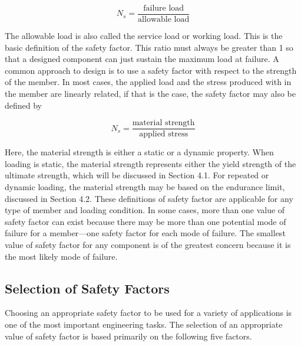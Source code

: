 \documentclass[a4paper,openany,12pt]{book}
\begin{document}
$$N_s = \frac{\text{failure load}}{\text{allowable load}}$$

The allowable load is also called the service load or working load. This
is the basic definition of the safety factor. This ratio must always be
greater than 1 so that a designed component can just sustain the maximum
load at failure. A common approach to design is to use a safety factor
with respect to the strength of the member. In most cases, the applied
load and the stress produced with in the member are linearly related, if
that is the case, the safety factor may also be defined by

$$N_s = \frac{\text{material strength}}{\text{applied stress}}$$

Here, the material strength is either a static or a dynamic property.
When loading is static, the material strength represents either the
yield strength of the ultimate strength, which will be discussed in
Section 4.1. For repeated or dynamic loading, the material strength may
be based on the endurance limit, discussed in Section 4.2. These
definitions of safety factor are applicable for any type of member and
loading condition. In some cases, more than one value of safety factor
can exist because there may be more than one potential mode of failure
for a member---one safety factor for each mode of failure. The smallest
value of safety factor for any component is of the greatest concern
because it is the most likely mode of failure.

\subsection{Selection of Safety Factors}
\label{selection-of-safety-factors}
Choosing an appropriate safety factor to be used for a variety of
applications is one of the most important engineering tasks. The
selection of an appropriate value of safety factor is based primarily on
the following five factors.
\end{document}
